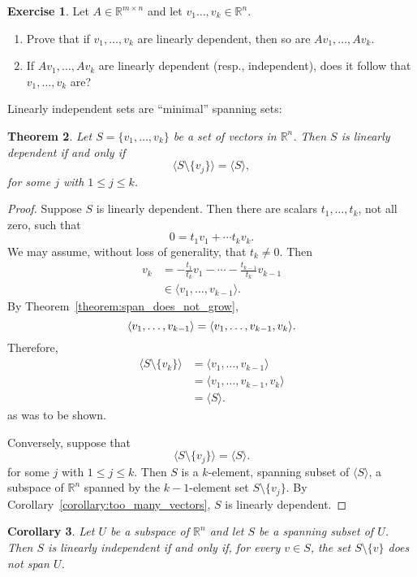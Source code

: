 \documentclass{amsart}
\newcommand{\RR}{\mathbb{R}}
\newtheorem{theorem}{Theorem}[section]
\newtheorem{corollary}[theorem]{Corollary}
\theoremstyle{definition}
\newtheorem{exercise}[theorem]{Exercise}
\begin{document}
\begin{exercise}
  Let $A\in\RR^{m\times n}$ and let $v_1\ldots,v_k\in \RR^n$.
  \begin{enumerate}
    \item Prove that if $v_1,\ldots, v_k$ are linearly dependent, then so are $Av_1,\ldots,Av_k$.
    \item If $Av_1,\ldots,Av_k$ are linearly dependent (resp., independent), does it follow that $v_1,\ldots,v_k$ are?
\end{enumerate}
\end{exercise}

Linearly independent sets are ``minimal'' spanning sets:

\begin{theorem}
Let $S=\{v_1,\ldots,v_k\}$ be a set of vectors in $\RR^n$. Then $S$ is linearly dependent if and only if 
\[
\langle S\setminus\{v_j\}\rangle = \langle S\rangle,
\]
for some $j$ with $1\leq j\leq k$.
\end{theorem}

\begin{proof}
Suppose $S$ is linearly dependent. Then there are scalars $t_1,\ldots,t_k$, not all zero, such that
\[
0=t_1v_1+\cdots t_kv_k.
\]
We may assume, without loss of generality, that $t_k\neq 0$.
Then
\begin{align*}
v_k &= -\frac{t_1}{t_k}v_1 - \cdots - \frac{t_{k-1}}{t_k}{v_{k-1}}\\
&\in \langle v_1,\ldots,v_{k-1}\rangle.
\end{align*}
By Theorem~\ref{theorem:span_does_not_grow},
\[
\langle v_1,\ldots,v_{k-1}\rangle\\
= \langle v_1,\ldots,v_{k-1},v_k\rangle. 
\]
Therefore,
\begin{align*}
\langle S\setminus \{v_k\}\rangle &= \langle v_1,\ldots,v_{k-1}\rangle\\
&= \langle v_1,\ldots,v_{k-1},v_k\rangle\\
&= \langle S\rangle.
\end{align*}
as was to be shown.

Conversely, suppose that
\[
\langle S\setminus\{v_j\}\rangle = \langle S\rangle.
\]
for some $j$ with $1\leq j\leq k$.
Then $S$ is a $k$-element, spanning subset of $\langle S\rangle$, a subspace of $\RR^n$ spanned by the $k-1$-element set $S\setminus\{v_j\}$. By Corollary~\ref{corollary:too_many_vectors}, $S$ is linearly dependent.
\end{proof}

\begin{corollary}
  Let $U$ be a subspace of $\RR^n$ and let $S$ be a spanning subset of $U$. Then $S$ is linearly independent if and only if, for every $v\in S$, the set $S\setminus\{v\}$ does not span $U$.
\end{corollary}
\end{document}
